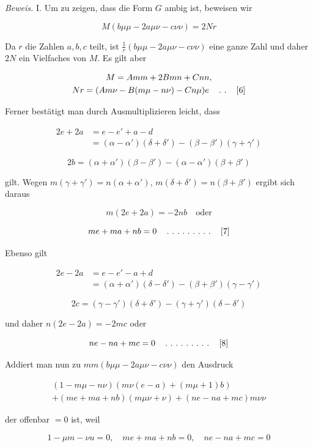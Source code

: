 \emph{Beweis.} I. Um zu zeigen, dass die Form $G$ ambig ist, beweisen wir

\[
M(b\mu\mu-2a\mu\nu-c\nu\nu)=2Nr
\]

Da $r$ die Zahlen $a,b,c$ teilt, ist $\frac{1}{r}(b\mu\mu-2a\mu\nu-c\nu\nu)$ eine ganze Zahl und daher $2N$ ein Vielfaches von $M$. Es gilt aber

\[
\begin{gathered}M=Amm+2Bmn+Cnn,\\Nr=(Am\nu-B(m\mu-n\nu)-Cn\mu)e\quad\mathinner{.\ .}\quad[6]\end{gathered}
\]

Ferner bestätigt man durch Ausmultiplizieren leicht, dass

\[
\begin{aligned}2e+2a&=e-e'+a-d\\&=(\alpha-\alpha')(\delta+\delta')-(\beta-\beta')(\gamma+\gamma')\end{aligned}
\]

\[
2b=(\alpha+\alpha')(\beta-\beta')-(\alpha-\alpha')(\beta+\beta')
\]

gilt. Wegen $m(\gamma+\gamma')=n(\alpha+\alpha')$, $m(\delta+\delta')=n(\beta+\beta')$ ergibt sich daraus

\[
m(2e+2a)=-2nb\quad\text{oder}
\]

\[
me+ma+nb=0\quad\mathinner{.\ .\ .\ .\ .\ .\ .\ .\ .}\quad[7]
\]

Ebenso gilt

\[
\begin{aligned}2e-2a&=e-e'-a+d\\&=(\alpha+\alpha')(\delta-\delta')-(\beta+\beta')(\gamma-\gamma')\end{aligned}
\]

\[
2c=(\gamma-\gamma')(\delta+\delta')-(\gamma+\gamma')(\delta-\delta')
\]

und daher $n(2e-2a)=-2mc$ oder

\[
ne-na+mc=0\quad\mathinner{.\ .\ .\ .\ .\ .\ .\ .\ .}\quad[8]
\]

Addiert man nun zu $mm(b\mu\mu-2a\mu\nu-c\nu\nu)$ den Ausdruck

\[
\begin{gathered}(1-m\mu-n\nu)(m\nu(e-a)+(m\mu+1)b)\\+(me+ma+nb)(m\mu\nu+\nu)+(ne-na+mc)m\nu\nu\end{gathered}
\]

der offenbar $=0$ ist, weil

\[
1-\mu m-\nu u=0,\quad me+ma+nb=0,\quad ne-na+mc=0
\]

